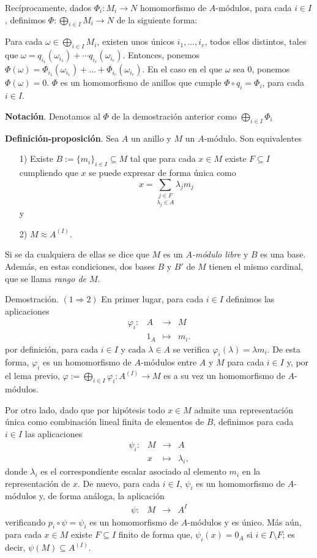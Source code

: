 \documentclass[a4paper,12pt]{article}
\begin{document}
Recíprocamente, dados $\Phi_i:M_i\rightarrow N$ homomorfismo de $A$-módulos, para cada $i\in I$, definimos $\Phi:\bigoplus_{i\in I} M_i\rightarrow N$ de la siguiente forma:

Para cada $\omega \in \bigoplus_{i\in I} M_i$, existen unos únicos $i_1,...,i_r$, todos ellos distintos, tales que $\omega=q_{i_1}(\omega_{i_1})+\cdots q_{i_r}(\omega_{i_r})$. Entonces, ponemos $\Phi(\omega)=\Phi_{i_1}(\omega_{i_1})+...+\Phi_{i_r}(\omega_{i_r})$. En el caso en el que $\omega$ sea $0$, ponemos $\Phi(\omega)=0$. $\Phi$ es un homomorfismo de anillos que cumple $\Phi\circ q_i = \Phi_i$, para cada $i\in I$.

\textbf{Notación}. Denotamos al $\Phi$ de la demostración anterior como $\bigoplus_{i\in I} \Phi_i$

\textbf{Definición-proposición}. Sea $A$ un anillo y $M$ un $A$-módulo. Son equivalentes
\begin{itemize}
    \item[1)] Existe $B:={\{m_i\}}_{i\in I}\subseteq M$ tal que para cada $x\in M$ existe $F\subseteq I$ cumpliendo que $x$ se puede expresar de forma única como$$x=\underset{\lambda_j\in A}{\sum_{j\in F}}\lambda_j m_j$$ y 
    \item[2)] $M\approx A^{(I)}$.
\end{itemize}
Si se da cualquiera de ellas se dice que $M$ es un \textit{$A$-módulo libre} y $B$ es una base. Además, en estas condiciones, dos bases $B$ y $B'$ de $M$ tienen el mismo cardinal, que se llama \textit{rango de $M$}.

Demostración. $(1\Rightarrow 2)$ En primer lugar, para cada $i\in I$ definimos las aplicaciones
$$\begin{array}{rccl}
    \varphi_i:&A&\longrightarrow&M\\
    &1_A&\longmapsto&m_i.
\end{array}$$
por definición, para cada $i\in I$ y cada $\lambda\in A$ se verifica $\varphi_i(\lambda)=\lambda m_i$. 
De esta forma, $\varphi_i$ es un homomorfismo de $A$-módulos entre $A$ y $M$ para cada $i\in I$ y, por el lema previo, $\varphi:=\bigoplus_{i\in I}\varphi_i: A^{(I)}\longrightarrow M$ es a su vez un homomorfismo de $A$-módulos.

Por otro lado, dado que por hipótesis todo $x\in M$ admite una representación única como combinación lineal finita de elementos de $B$, definimos para cada $i\in I$ las aplicaciones
$$\begin{array}{rccl}
    \psi_i:&M&\longrightarrow&A\\
    &x&\longmapsto&\lambda_i,
\end{array}$$
donde $\lambda_i$ es el correspondiente escalar asociado al elemento $m_i$ en la representación de $x$. De nuevo, para cada $i\in I$, $\psi_i$ es un homomorfismo de $A$-módulos y, de forma análoga, la aplicación
$$\begin{array}{rccl}
    \psi:&M&\longrightarrow&A^I
\end{array}$$
verificando $p_i\circ\psi=\psi_i$ es un homomorfismo de $A$-módulos y es único. Más aún, para cada $x\in M$ existe $F\subseteq I$ finito de forma que, $\psi_i(x)=0_A$ si $i\in I\setminus F$; es decir, $\psi(M)\subseteq A^{(I)}$. 
\end{document}

